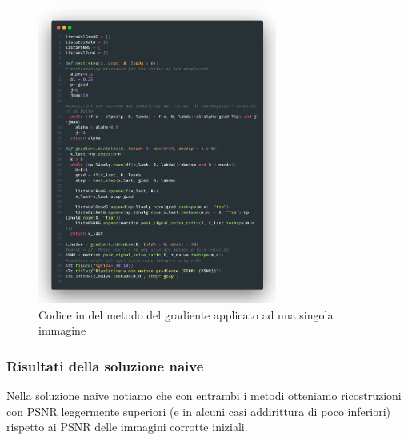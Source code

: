 \begin{figure}[H]
    \centering
    \includegraphics[width=0.7\textwidth]{imgCode/metGrad.png}
    \caption{Codice in  del metodo del gradiente applicato ad una singola immagine}
\end{figure}

{\color{oorange}\subsubsection{Risultati della soluzione naive}}
Nella soluzione naive notiamo che con entrambi i metodi otteniamo ricostruzioni con PSNR leggermente 
superiori (e in alcuni casi addirittura di poco inferiori) rispetto ai PSNR delle immagini corrotte iniziali.
